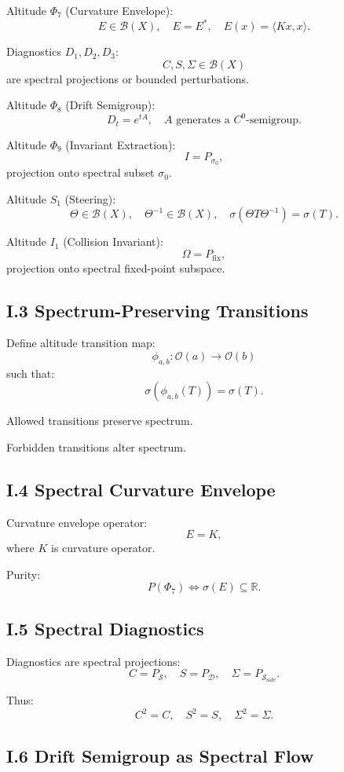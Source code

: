 Altitude $\Phi_7$ (Curvature Envelope):
\[
E \in \mathcal{B}(X),\quad E = E^*,\quad E(x) = \langle Kx, x \rangle.
\]

Diagnostics $D_1, D_2, D_3$:
\[
C,S,\Sigma \in \mathcal{B}(X)
\]
are spectral projections or bounded perturbations.

Altitude $\Phi_8$ (Drift Semigroup):
\[
D_t = e^{tA},\quad A \text{ generates a } C^0\text{-semigroup}.
\]

Altitude $\Phi_9$ (Invariant Extraction):
\[
I = P_{\sigma_0},
\]
projection onto spectral subset $\sigma_0$.

Altitude $S_1$ (Steering):
\[
\Theta \in \mathcal{B}(X),\quad \Theta^{-1} \in \mathcal{B}(X),\quad
\sigma(\Theta T \Theta^{-1}) = \sigma(T).
\]

Altitude $I_1$ (Collision Invariant):
\[
\Omega = P_{\mathrm{fix}},
\]
projection onto spectral fixed-point subspace.

\subsection*{I.3 Spectrum-Preserving Transitions}

Define altitude transition map:
\[
\phi_{a,b} : \mathcal{O}(a) \to \mathcal{O}(b)
\]
such that:
\[
\sigma(\phi_{a,b}(T)) = \sigma(T).
\]

Allowed transitions preserve spectrum.

Forbidden transitions alter spectrum.

\subsection*{I.4 Spectral Curvature Envelope}

Curvature envelope operator:
\[
E = K,
\]
where $K$ is curvature operator.

Purity:
\[
P(\Phi_7) \iff \sigma(E) \subseteq \mathbb{R}.
\]

\subsection*{I.5 Spectral Diagnostics}

Diagnostics are spectral projections:
\[
C = P_{\mathcal{S}},\quad S = P_{\mathcal{D}},\quad
\Sigma = P_{\mathcal{S}_{\mathrm{safe}}}.
\]

Thus:
\[
C^2 = C,\quad S^2 = S,\quad \Sigma^2 = \Sigma.
\]

\subsection*{I.6 Drift Semigroup as Spectral Flow}

